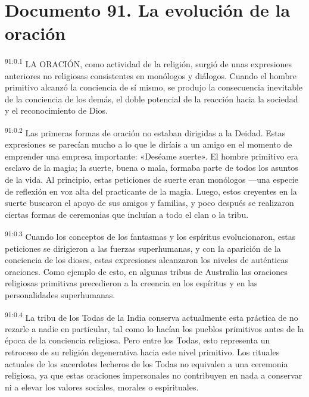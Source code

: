 \chapter{Documento 91. La evolución de la oración}
\par
\textsuperscript{91:0.1} LA ORACIÓN, como actividad de la religión, surgió de unas expresiones anteriores no religiosas consistentes en monólogos y diálogos. Cuando el hombre primitivo alcanzó la conciencia de sí mismo, se produjo la consecuencia inevitable de la conciencia de los demás, el doble potencial de la reacción hacia la sociedad y el reconocimiento de Dios.

\par
\textsuperscript{91:0.2} Las primeras formas de oración no estaban dirigidas a la Deidad. Estas expresiones se parecían mucho a lo que le diríais a un amigo en el momento de emprender una empresa importante: «Deséame suerte». El hombre primitivo era esclavo de la magia; la suerte, buena o mala, formaba parte de todos los asuntos de la vida. Al principio, estas peticiones de suerte eran monólogos ---una especie de reflexión en voz alta del practicante de la magia. Luego, estos creyentes en la suerte buscaron el apoyo de sus amigos y familias, y poco después se realizaron ciertas formas de ceremonias que incluían a todo el clan o la tribu.

\par
\textsuperscript{91:0.3} Cuando los conceptos de los fantasmas y los espíritus evolucionaron, estas peticiones se dirigieron a las fuerzas superhumanas, y con la aparición de la conciencia de los dioses, estas expresiones alcanzaron los niveles de auténticas oraciones. Como ejemplo de esto, en algunas tribus de Australia las oraciones religiosas primitivas precedieron a la creencia en los espíritus y en las personalidades superhumanas.

\par
\textsuperscript{91:0.4} La tribu de los Todas de la India conserva actualmente esta práctica de no rezarle a nadie en particular, tal como lo hacían los pueblos primitivos antes de la época de la conciencia religiosa. Pero entre los Todas, esto representa un retroceso de su religión degenerativa hacia este nivel primitivo. Los rituales actuales de los sacerdotes lecheros de los Todas no equivalen a una ceremonia religiosa, ya que estas oraciones impersonales no contribuyen en nada a conservar ni a elevar los valores sociales, morales o espirituales.

